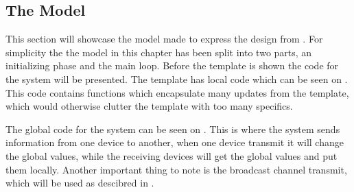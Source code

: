 \subsection{The Model}\label{sec:themodel}
This section will showcase the model made to express the design from .
For simplicity the the model in this chapter has been split into two parts, an initializing phase and the main loop.
Before the template is shown the code for the system will be presented.
The template has local code which can be seen on .
This code contains functions which encapsulate many updates from the template, which would otherwise clutter the template with too many specifics.

The global code for the system can be seen on .
This is where the system sends information from one device to another, when one device transmit it will change the global values, while the receiving devices will get the global values and put them locally.
Another important thing to note is the broadcast channel transmit, which will be used as descibred in .

